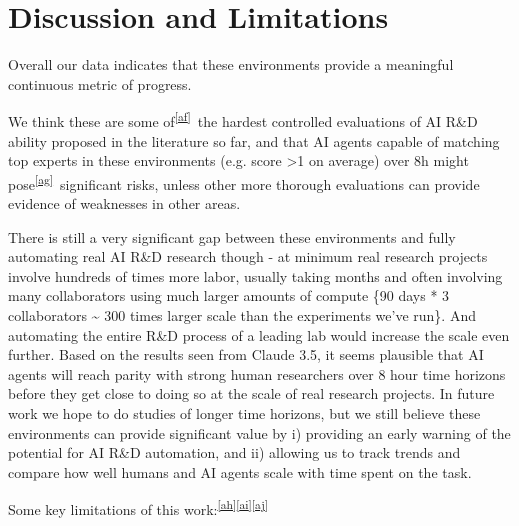 \documentclass[
]{article}
\begin{document}
\section{\texorpdfstring{{Discussion and
Limitations}}{Discussion and Limitations}}\label{h.894ew8oy1x08}

{Overall our data indicates that these environments provide a meaningful
continuous metric of progress. }

{We think these are }{some
of}\textsuperscript{\label{cmnt_ref32}\hyperref[cmnt32]{{[}af{]}}}{~the
hardest controlled evaluations of AI R\&D ability proposed in the
literature so far, and that AI agents capable of matching top experts in
these environments (e.g. score \textgreater1 on average) over 8h }{might
pose}\textsuperscript{\label{cmnt_ref33}\hyperref[cmnt33]{{[}ag{]}}}{~significant
risks, unless other more thorough evaluations can provide evidence of
weaknesses in other areas. }

{}

{There is still a very significant gap between these environments and
fully automating real AI R\&D research }{though }{- at minimum real
research projects involve hundreds of times more labor, usually taking
months and often involving many collaborators using much larger amounts
of compute \{90 days * 3 collaborators \textasciitilde{} 300 times
larger scale than the experiments we've run\}. And automating the entire
R\&D process of a leading lab would increase the scale even further.
Based on the results seen from Claude 3.5, it seems plausible that AI
agents will reach parity with strong human researchers over 8 hour time
horizons before they get close to doing so at the scale of real research
projects. In future work we hope to do studies of longer time horizons,
but we still believe these environments can provide significant value by
i) providing an early warning of the potential for AI R\&D automation,
and ii) allowing us to track trends and compare how well humans and AI
agents scale with time spent on the task. }

{}

{Some key limitations of this
work:}\textsuperscript{\label{cmnt_ref34}\hyperref[cmnt34]{{[}ah{]}}\label{cmnt_ref35}\hyperref[cmnt35]{{[}ai{]}}\label{cmnt_ref36}\hyperref[cmnt36]{{[}aj{]}}}
\end{document}
